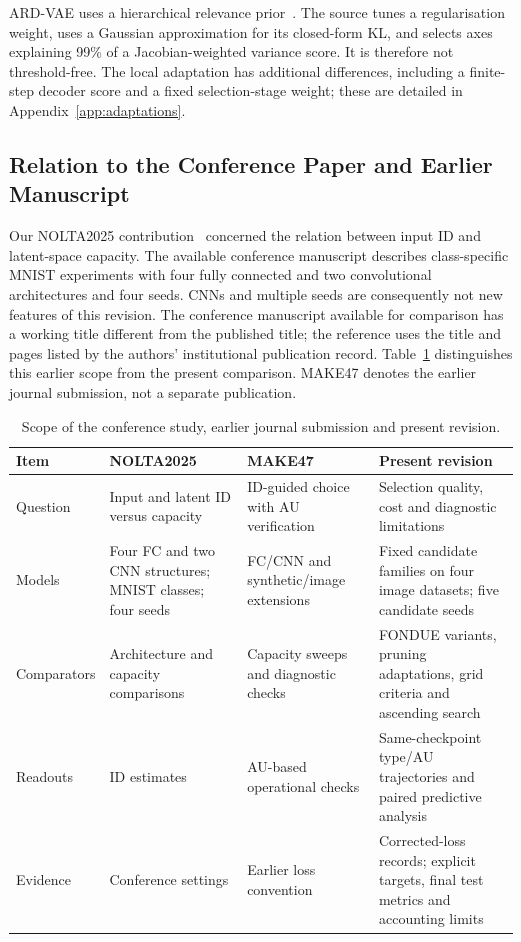 ARD-VAE uses a hierarchical relevance prior~\cite{saha2025ardvae}.
The source tunes a regularisation weight, uses a Gaussian approximation
for its closed-form KL, and selects axes explaining 99\% of a
Jacobian-weighted variance score. It is therefore not threshold-free.
The local adaptation has additional differences, including a finite-step
decoder score and a fixed selection-stage weight; these are detailed in
Appendix~\ref{app:adaptations}.

\subsection{Relation to the Conference Paper and Earlier Manuscript}
Our NOLTA2025 contribution~\cite{obata2025manifold} concerned the relation
between input ID and latent-space capacity. The available conference
manuscript describes class-specific MNIST experiments with four fully
connected and two convolutional architectures and four seeds. CNNs and
multiple seeds are consequently not new features of this revision.
The conference manuscript available for comparison has a working title
different from the published title; the reference uses the title and
pages listed by the authors' institutional publication record.
Table~\ref{tab:history} distinguishes this earlier scope from the present
comparison. MAKE47 denotes the earlier journal submission, not a separate
publication.

\begin{table}[H]
\caption{Scope of the conference study, earlier journal submission and present revision.}
\label{tab:history}\small
\begin{tabularx}{\textwidth}{lXXX}\toprule
Item & NOLTA2025 & MAKE47 & Present revision \\\midrule
Question & Input and latent ID versus capacity & ID-guided choice with AU verification & Selection quality, cost and diagnostic limitations \\
Models & Four FC and two CNN structures; MNIST classes; four seeds & FC/CNN and synthetic/image extensions & Fixed candidate families on four image datasets; five candidate seeds \\
Comparators & Architecture and capacity comparisons & Capacity sweeps and diagnostic checks & FONDUE variants, pruning adaptations, grid criteria and ascending search \\
Readouts & ID estimates & AU-based operational checks & Same-checkpoint type/AU trajectories and paired predictive analysis \\
Evidence & Conference settings & Earlier loss convention & Corrected-loss records; explicit targets, final test metrics and accounting limits \\
\bottomrule\end{tabularx}
\end{table}

